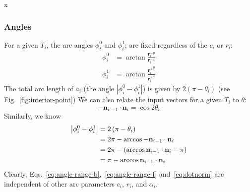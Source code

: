 \documentclass{article}
\begin{document}
%
x\subsubsection{Angles}
%
For a given $T_i$, the arc angles $\phi^0_i$ and $\phi^{1}_{i}$; are fixed regardless of the $c_i$ or $r_{i}$:
%
\begin{align}
  \label{eq:angle-range-b}
  \phi^{0}_{i} &= \arctan \frac{{\mathbf{r}^{-}_{i}}^{y}}{{\mathbf{r}^{-}_{i}}^{x}}\\
  \label{eq:angle-range-f}
  \phi^{1}_{i} &= \arctan \frac{{\mathbf{r}^{+}_{i}}^{y}}{{\mathbf{r}^{+}_{i}}^{x}}
\end{align}
%
The total arc length of $a_i$ (the angle $\left|\phi^0_i -\phi^1_i\right|$) is given by $2\left(\pi-\theta_i\right)$ (see Fig.~\ref{fig:interior-point})
%
We can also relate the input vectors for a given $T_{i}$ to $\theta$:
%
\begin{equation}
  \label{eq:dotnorm}
  -\mathbf{n}_{i-1} \cdot \mathbf{n}_i = \cos 2\theta_i
\end{equation}
%
Similarly, we know
%
\begin{align}
  \notag
  \left|\phi^0_i -\phi^1_i\right| &= 2\left(\pi-\theta_i\right)\\
  \notag
  &= 2\pi-\arccos -\mathbf{n}_{i-1} \cdot \mathbf{n}_i \\
  \notag
  &= 2\pi-\left(\arccos \mathbf{n}_{i-1} \cdot \mathbf{n}_i - \pi\right)\\
  \label{eq:arclen-dot}
  &= \pi-\arccos \mathbf{n}_{i-1} \cdot \mathbf{n}_i
\end{align}
%
Clearly, Eqs.~\eqref{eq:angle-range-b},~\eqref{eq:angle-range-f} and~\eqref{eq:dotnorm} are independent of other arc parameters $c_{i}$, $r_{i}$, and $\alpha_i$.
%
\end{document}
